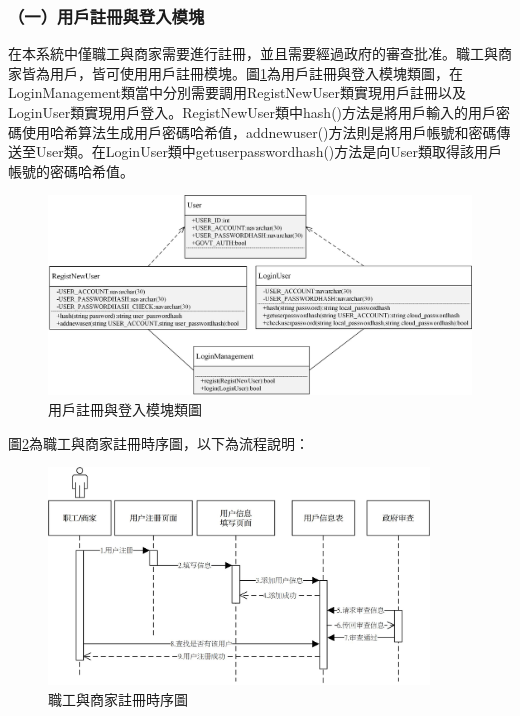 \subsubsection{（一）用戶註冊與登入模塊}
在本系統中僅職工與商家需要進行註冊，並且需要經過政府的審查批准。職工與商家皆為用戶，皆可使用用戶註冊模塊。圖\ref{c3}為用戶註冊與登入模塊類圖，在LoginManagement類當中分別需要調用RegistNewUser類實現用戶註冊以及LoginUser類實現用戶登入。RegistNewUser類中hash()方法是將用戶輸入的用戶密碼使用哈希算法生成用戶密碼哈希值，addnewuser()方法則是將用戶帳號和密碼傳送至User類。在LoginUser類中getuserpasswordhash()方法是向User類取得該用戶帳號的密碼哈希值。

	\begin{figure}[!htbp]
		\centering
		\includegraphics[width = 1\textwidth]{c3.jpg}
		\caption{用戶註冊與登入模塊類圖}\label{c3}
	\end{figure}

	圖\ref{time1}為職工與商家註冊時序圖，以下為流程說明：

	\begin{figure}[!htbp]
		\centering
		\includegraphics[width = 0.9\textwidth]{time1.jpg}
		\caption{職工與商家註冊時序圖}\label{time1}
	\end{figure}

